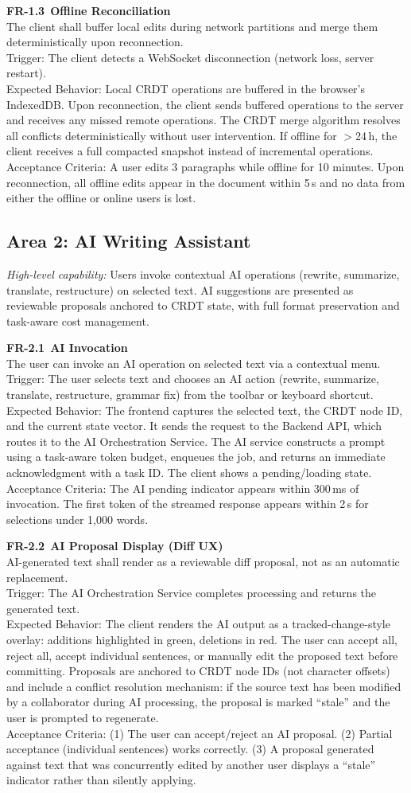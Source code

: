 \documentclass[10pt, a4paper]{article}
\newcommand{\requirement}[1]{\textcolor{accent}{\textsf{\textbf{#1}}}}
\newcommand{\lightrule}{{\color{border}\rule{\textwidth}{0.4pt}}}
\newcommand{\frcard}[6]{%
\vspace{4pt}
\noindent\begin{minipage}{\textwidth}
\noindent\requirement{#1}~\textbf{#2}\\[2pt]
{\small\color{inkSoft}#3}\\[3pt]
{\small\color{inkMuted}\textsf{Trigger:}} {\small #4}\\[1pt]
{\small\color{inkMuted}\textsf{Expected Behavior:}} {\small #5}\\[1pt]
{\small\color{inkMuted}\textsf{Acceptance Criteria:}} {\small #6}
\end{minipage}
\vspace{4pt}\lightrule\vspace{2pt}
}
\begin{document}
\frcard{FR-1.3}{Offline Reconciliation}{The client shall buffer local edits during network partitions and merge them deterministically upon reconnection.}{The client detects a WebSocket disconnection (network loss, server restart).}{Local CRDT operations are buffered in the browser's IndexedDB. Upon reconnection, the client sends buffered operations to the server and receives any missed remote operations. The CRDT merge algorithm resolves all conflicts deterministically without user intervention. If offline for $>$24\,h, the client receives a full compacted snapshot instead of incremental operations.}{A user edits 3 paragraphs while offline for 10 minutes. Upon reconnection, all offline edits appear in the document within 5\,s and no data from either the offline or online users is lost.}

\subsection{Area 2: AI Writing Assistant}

{\small\textit{High-level capability:} Users invoke contextual AI operations (rewrite, summarize, translate, restructure) on selected text. AI suggestions are presented as reviewable proposals anchored to CRDT state, with full format preservation and task-aware cost management.}

\frcard{FR-2.1}{AI Invocation}{The user can invoke an AI operation on selected text via a contextual menu.}{The user selects text and chooses an AI action (rewrite, summarize, translate, restructure, grammar fix) from the toolbar or keyboard shortcut.}{The frontend captures the selected text, the CRDT node ID, and the current state vector. It sends the request to the Backend API, which routes it to the AI Orchestration Service. The AI service constructs a prompt using a task-aware token budget, enqueues the job, and returns an immediate acknowledgment with a task ID. The client shows a pending/loading state.}{The AI pending indicator appears within 300\,ms of invocation. The first token of the streamed response appears within 2\,s for selections under 1,000 words.}

\frcard{FR-2.2}{AI Proposal Display (Diff UX)}{AI-generated text shall render as a reviewable diff proposal, not as an automatic replacement.}{The AI Orchestration Service completes processing and returns the generated text.}{The client renders the AI output as a tracked-change-style overlay: additions highlighted in green, deletions in red. The user can accept all, reject all, accept individual sentences, or manually edit the proposed text before committing. Proposals are anchored to CRDT node IDs (not character offsets) and include a conflict resolution mechanism: if the source text has been modified by a collaborator during AI processing, the proposal is marked ``stale'' and the user is prompted to regenerate.}{(1) The user can accept/reject an AI proposal. (2) Partial acceptance (individual sentences) works correctly. (3) A proposal generated against text that was concurrently edited by another user displays a ``stale'' indicator rather than silently applying.}
\end{document}
